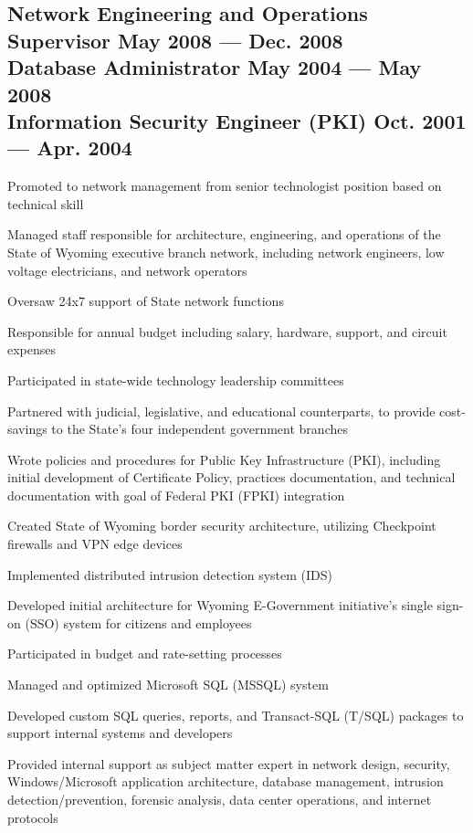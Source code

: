 \documentclass[letter,10pt]{article}
\begin{document}
\subsection{Network Engineering and Operations Supervisor \hfill May 2008 --- Dec. 2008\\
	Database Administrator \hfill May 2004 --- May 2008\\
	Information Security Engineer (PKI) \hfill Oct. 2001 --- Apr. 2004}
\begin{zitemize}
	\item Promoted to network management from senior technologist
	position based on technical skill
	\item Managed staff responsible for architecture, engineering,
	and operations of the State of Wyoming executive branch
	network, including network engineers, low voltage
	electricians, and network operators
	\item Oversaw 24x7 support of State network functions
	\item Responsible for annual budget including salary, hardware,
	support, and circuit expenses
	\item Participated in state-wide technology leadership committees
	\item Partnered with judicial, legislative, and educational
	counterparts, to provide cost-savings to the State's
	four independent government branches
	\item Wrote policies and procedures for Public Key
	Infrastructure (PKI), including initial development of
	Certificate Policy, practices documentation, and
	technical documentation with goal of Federal PKI (FPKI)
	integration
	\item Created State of Wyoming border security architecture,
	utilizing Checkpoint firewalls and VPN edge devices
	\item Implemented distributed intrusion detection system (IDS)
	\item Developed initial architecture for Wyoming E-Government
	initiative's single sign-on (SSO) system for citizens and
	employees
	\item Participated in budget and rate-setting processes
	\item Managed and optimized Microsoft SQL (MSSQL) system
	\item Developed custom SQL queries, reports, and Transact-SQL
	(T/SQL) packages to support internal systems and
	developers
	\item Provided internal support as subject matter expert in
	network design, security, Windows/Microsoft application
	architecture, database management, intrusion
	detection/prevention, forensic analysis, data center
	operations, and internet protocols
\end{zitemize}
\end{document}
